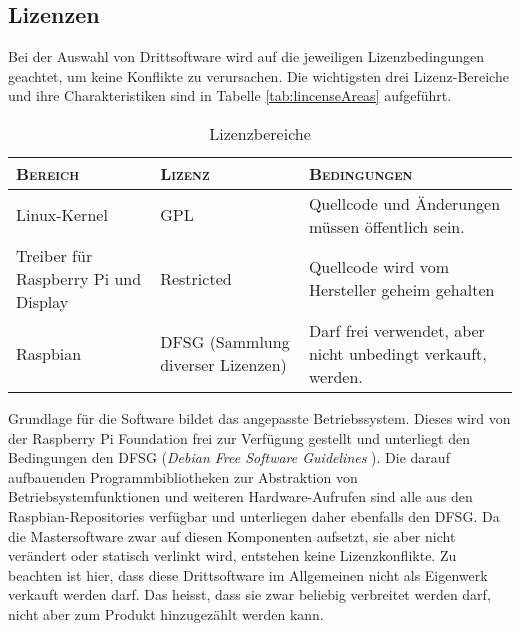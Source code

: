 \clearpage
\subsection{Lizenzen}
\label{subsec:software:master:licenses}

Bei    der   Auswahl    von    Drittsoftware   wird    auf   die    jeweiligen
Lizenzbedingungen   geachtet,   um   keine   Konflikte   zu   verursachen. Die
wichtigsten  drei Lizenz-Bereiche  und ihre  Charakteristiken sind  in Tabelle
\ref{tab:lincenseAreas} aufgef\"uhrt.

\begin{table}[h!tb]
    \centering
    \caption{Lizenzbereiche}
    \label{tab:licenseAreas}
    \small
    \begin{tabular}{>{\raggedright}p{30mm}>{\raggedright}p{30mm}p{50mm}}
        \toprule
        \textsc{Bereich} &
        \textsc{Lizenz} &
        \textsc{Bedingungen} \\
        \midrule
        Linux-Kernel &
        GPL &
        Quellcode und \"Anderungen m\"ussen \"offentlich sein. \\
        [2mm]

        \rowcolor{solarized-base2}
        Treiber f\"ur Raspberry Pi und Display &
        Restricted &
        Quellcode wird vom Hersteller geheim gehalten \\
        [2mm]

        Raspbian &
        DFSG (Sammlung diverser Lizenzen) &
        Darf frei verwendet, aber nicht unbedingt verkauft, werden. \\
        \bottomrule
    \end{tabular}
\end{table}

Grundlage  f\"ur die  Software  bildet  das angepasste  Betriebssystem. Dieses
wird  von  der Raspberry  Pi  Foundation  frei  zur Verf\"ugung  gestellt  und
unterliegt den  Bedingungen den  DFSG (\emph{Debian Free  Software Guidelines}
\cite{ref:socialContract}). Die  darauf  aufbauenden Programmbibliotheken  zur
Abstraktion  von Betriebsystemfunktionen  und weiteren  Hardware-Aufrufen sind
alle aus den Raspbian-Repositories verf\"ugbar und unterliegen daher ebenfalls
den  DFSG.   Da  die  Mastersoftware zwar  auf  diesen  Komponenten  aufsetzt,
sie  aber  nicht ver\"andert  oder  statisch  verlinkt wird,  entstehen  keine
Lizenzkonflikte. Zu beachten ist hier, dass diese Drittsoftware im Allgemeinen
nicht als Eigenwerk  verkauft werden darf. Das heisst, dass  sie zwar beliebig
verbreitet werden darf, nicht aber zum Produkt hinzugez\"ahlt werden kann.

